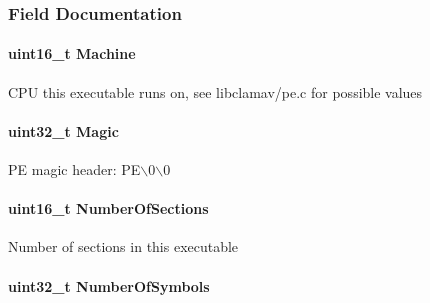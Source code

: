 \subsubsection{Field Documentation}
\hypertarget{structpe__image__file__hdr_a51d503029c67ea2862fe31a71cd4212d}{
\paragraph[{Machine}]{\setlength{\rightskip}{0pt plus 5cm}uint16\_\-t {\bf Machine}}}
\label{structpe__image__file__hdr_a51d503029c67ea2862fe31a71cd4212d}
CPU this executable runs on, see libclamav/pe.c for possible values \hypertarget{structpe__image__file__hdr_aacdf4d16fc118936413e1bfe23b9e444}{
\paragraph[{Magic}]{\setlength{\rightskip}{0pt plus 5cm}uint32\_\-t {\bf Magic}}}
\label{structpe__image__file__hdr_aacdf4d16fc118936413e1bfe23b9e444}
PE magic header: PE$\backslash$0$\backslash$0 \hypertarget{structpe__image__file__hdr_aad0798860a6f2bc09b927345db02e074}{
\paragraph[{NumberOfSections}]{\setlength{\rightskip}{0pt plus 5cm}uint16\_\-t {\bf NumberOfSections}}}
\label{structpe__image__file__hdr_aad0798860a6f2bc09b927345db02e074}
Number of sections in this executable \hypertarget{structpe__image__file__hdr_a4dbc3cb95c8f5dfe95a9c7d346db9844}{
\paragraph[{NumberOfSymbols}]{\setlength{\rightskip}{0pt plus 5cm}uint32\_\-t {\bf NumberOfSymbols}}}
\label{structpe__image__file__hdr_a4dbc3cb95c8f5dfe95a9c7d346db9844}
